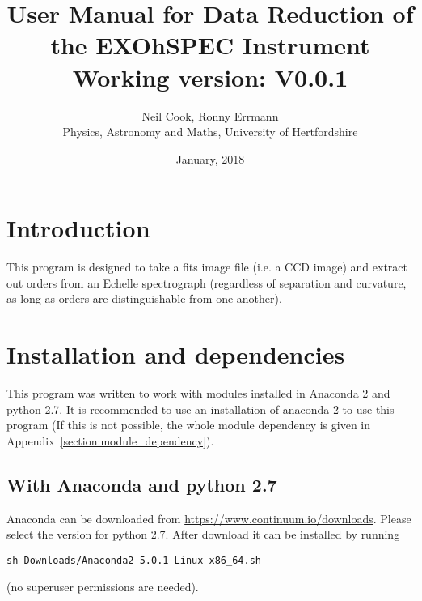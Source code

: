 \documentclass[10pt,a4paper]{article}
\title{User Manual for Data Reduction of the EXOhSPEC Instrument \\ Working version: V0.0.1}
\date{January, 2018}
\author{Neil Cook, Ronny Errmann\\ Physics, Astronomy and Maths, University of Hertfordshire}
\begin{document}
\maketitle

\tableofcontents
{}




\section{Introduction}
\label{intro}




This program is designed to take a fits image file (i.e. a CCD image) and extract out orders from an Echelle spectrograph (regardless of separation and curvature, as long as orders are distinguishable from one-another). 



\newpage
\section{Installation and dependencies}
\label{installation}

\noindent This program was written to work with modules installed in Anaconda 2 and python 2.7. It is recommended to use an installation of anaconda 2 to use this program (If this is not possible, the whole module dependency is given in Appendix~\ref{section:module_dependency}).


\subsection{With Anaconda and python 2.7}

\noindent Anaconda can be downloaded from \url{https://www.continuum.io/downloads}. Please select the version for python 2.7. After download it can be installed by running
\begin{lstlisting}[style=base]
sh Downloads/Anaconda2-5.0.1-Linux-x86_64.sh
\end{lstlisting}
(no superuser permissions are needed).
\end{document}
